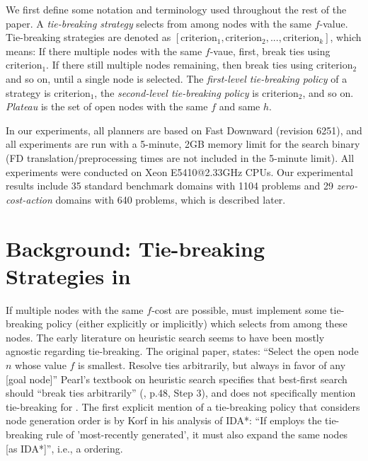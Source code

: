 We first define some notation and terminology used throughout the rest of the paper.
A \emph{tie-breaking strategy} selects from among nodes with the same $f$-value.
Tie-breaking strategies are denoted as $[\text{criterion}_1, \text{criterion}_2, ..., \text{criterion}_k]$,
which means: If there multiple nodes with the same $f$-vaue, first, break ties using $\text{criterion}_1$. 
If there still multiple nodes remaining, then break ties using $\text{criterion}_2$ and so on, until a single node is selected.
The \emph{first-level tie-breaking policy} of a strategy is
$\text{criterion}_1$, the \emph{second-level tie-breaking policy} is
$\text{criterion}_2$, and so on.
\emph{Plateau} is the set of open nodes with the same $f$ and same $h$.

In our experiments, all planners are based on Fast Downward (revision 6251), and all
experiments are run with a 5-minute, 2GB memory limit for the search binary (FD translation/preprocessing times are not included in the 5-minute limit).
All experiments were conducted on Xeon E5410@2.33GHz CPUs.
Our experimental results include 35 standard benchmark domains with 1104
problems and 29 \emph{zero-cost-action} domains with 640 problems, which is
described later.

\section{Background: Tie-breaking Strategies in \astar}


If multiple nodes with the same $f$-cost are possible, \astar
must implement some tie-breaking policy (either
explicitly or implicitly) which selects from among these nodes.
The early literature on heuristic search seems to have been mostly agnostic regarding tie-breaking.
The original \astar paper, 
states: ``Select the open node $n$ whose value $f$
is smallest. Resolve ties arbitrarily, but always in favor of any [goal
node]'' \cite[p.102 Step 2]{hart1968formal} %
Pearl's textbook on heuristic search specifies that best-first search should ``break ties arbitrarily'' (\citeyear{pearl1984heuristics}, p.48, Step 3), and does not specifically mention tie-breaking for \astar.
The first explicit mention of a tie-breaking policy that considers node generation order is by Korf in his analysis of IDA*: ``If \astar employs the tie-breaking rule of 'most-recently generated', it must also expand the same nodes [as IDA*]'', i.e., a \lifo ordering.

